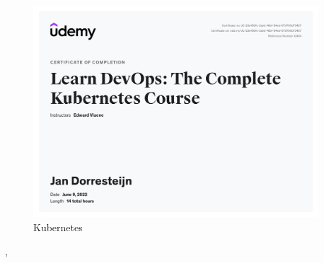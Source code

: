 {{\begin{figure}
\begin{center}
				\includegraphics[width=0.95\textwidth]{images/kube.jpg}
			\end{center}
			\caption{Kubernetes}
			\label{fig:kubernets}
		\end{figure}

	},
}


